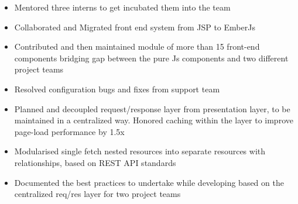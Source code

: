 \documentclass[]{deedy-resume-openfont}
\begin{document}
\begin{minipage}[t]{0.66\textwidth}
\begin{itemize}
\item Mentored three interns to get incubated them into the team
\item Collaborated and Migrated front end system from JSP to EmberJs
\item Contributed and then maintained module of more than 15 front-end components bridging gap between the pure Js components and two different project teams
\item Resolved configuration bugs and fixes from support team
\item Planned and decoupled request/response layer from presentation layer, to be maintained in a centralized way. Honored caching within the layer to improve page-load performance by 1.5x
\item Modularised single fetch nested resources into separate resources with relationships, based on REST API standards
\item Documented the best practices to undertake while developing based on the centralized req/res layer for two project teams
\end{itemize}
\sectionsep






\end{minipage}
\end{document}
